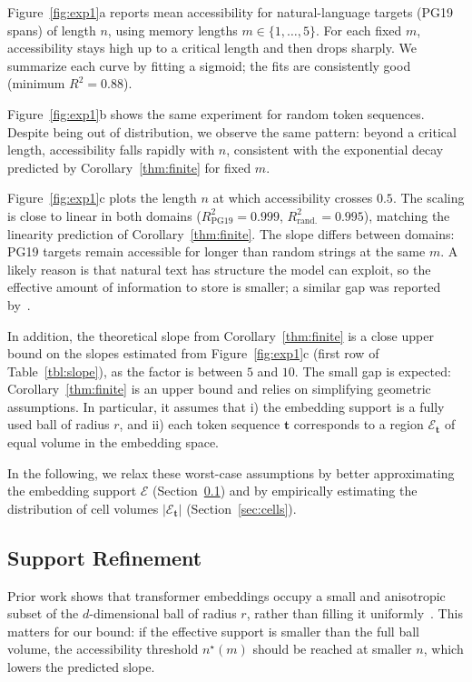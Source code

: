 Figure~\ref{fig:exp1}a reports mean accessibility for natural-language targets (PG19 spans) of length $n$, using memory lengths $m\in\{1,\ldots,5\}$. 
For each fixed $m$, accessibility stays high up to a critical length and then drops sharply. We summarize each curve by fitting a sigmoid; the fits are consistently good (minimum $R^2=0.88$).

Figure~\ref{fig:exp1}b shows the same experiment for random token sequences. Despite being out of distribution, we observe the same pattern: beyond a critical length, accessibility falls rapidly with $n$, consistent with the exponential decay predicted by Corollary~\ref{thm:finite} for fixed $m$.

Figure~\ref{fig:exp1}c plots the length $n$ at which accessibility crosses $0.5$. The scaling is close to linear in both domains ($R^2_{\text{PG19}}=0.999$, $R^2_{\text{rand.}}=0.995$), matching the linearity prediction of Corollary~\ref{thm:finite}. The slope differs between domains: PG19 targets remain accessible for longer than random strings at the same $m$. A likely reason is that natural text has structure the model can exploit, so the effective amount of information to store is smaller; a similar gap was reported by~\citet{kuratov-etal-2025-cramming}.

In addition, the theoretical slope from Corollary~\ref{thm:finite} is a close upper bound on the slopes estimated from Figure~\ref{fig:exp1}c (first row of Table~\ref{tbl:slope}), as the factor is between $5$ and $10$. 
The small gap is expected: Corollary~\ref{thm:finite} is an upper bound and relies on simplifying geometric assumptions. 
In particular, it assumes that 
i) the embedding support is a fully used ball of radius $r$, and 
ii) each token sequence $\mathbf t$ corresponds to a region $\mathcal{E}_{\mathbf t}$ of equal volume in the embedding space. 

In the following, we relax these worst-case assumptions by better approximating the embedding support $\mathcal{E}$ (Section~\ref{sec:support}) and by empirically estimating the distribution of cell volumes $|\mathcal{E}_{\mathbf t}|$ (Section~\ref{sec:cells}).

\subsection{Support Refinement}
\label{sec:support}

Prior work shows that transformer embeddings occupy a small and anisotropic subset of the $d$-dimensional ball of radius $r$, rather than filling it uniformly~\citep{rudman-etal-2022-isoscore}. 
This matters for our bound: if the effective support is smaller than the full ball volume, the accessibility threshold $n^\star(m)$ should be reached at smaller $n$, which lowers the predicted slope.

